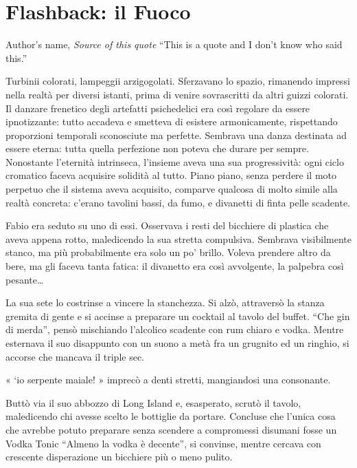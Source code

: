 \chapter{Flashback: il Fuoco}

\begin{chapquote}{Author's name, \textit{Source of this quote}}
``This is a quote and I don't know who said this.''
\end{chapquote}

Turbinii colorati, lampeggii arzigogolati. Sferzavano lo spazio, rimanendo impressi nella realtà per diversi istanti, prima di venire sovrascritti da altri guizzi colorati. Il danzare frenetico degli artefatti psichedelici era così regolare da essere ipnotizzante: tutto accadeva e smetteva di esistere armonicamente, rispettando proporzioni temporali sconosciute ma perfette. Sembrava una danza destinata ad essere eterna: tutta quella perfezione non poteva che durare per sempre. Nonostante l'eternità intrinseca, l'insieme aveva una sua progressività: ogni ciclo cromatico faceva acquisire solidità al tutto. Piano piano, senza perdere il moto perpetuo che il sistema aveva acquisito, comparve qualcosa di molto simile alla realtà concreta: c'erano tavolini bassi, da fumo, e divanetti di finta pelle scadente.

Fabio era seduto su uno di essi. Osservava i resti del bicchiere di plastica che aveva appena rotto, maledicendo la sua stretta compulsiva. Sembrava visibilmente stanco, ma più probabilmente era solo un po' brillo. Voleva prendere altro da bere, ma gli faceva tanta fatica: il divanetto era così avvolgente, la palpebra così pesante\ldots

La sua sete lo costrinse a vincere la stanchezza. Si alzò, attraversò la stanza gremita di gente e si accinse a preparare un cocktail al tavolo del buffet. ``Che gin di merda'', pensò mischiando l'alcolico scadente con rum chiaro e vodka. Mentre esternava il suo disappunto con un suono a metà fra un grugnito ed un ringhio, si accorse che mancava il triple sec.

« `io serpente maiale! » imprecò a denti stretti, mangiandosi una consonante.

Buttò via il suo abbozzo di Long Island e, esasperato, scrutò il tavolo, maledicendo chi avesse scelto le bottiglie da portare. Concluse che l'unica cosa che avrebbe potuto preparare senza scendere a compromessi disumani fosse un Vodka Tonic  ``Almeno la vodka è decente'', si convinse, mentre cercava con crescente disperazione un bicchiere più o meno pulito.

